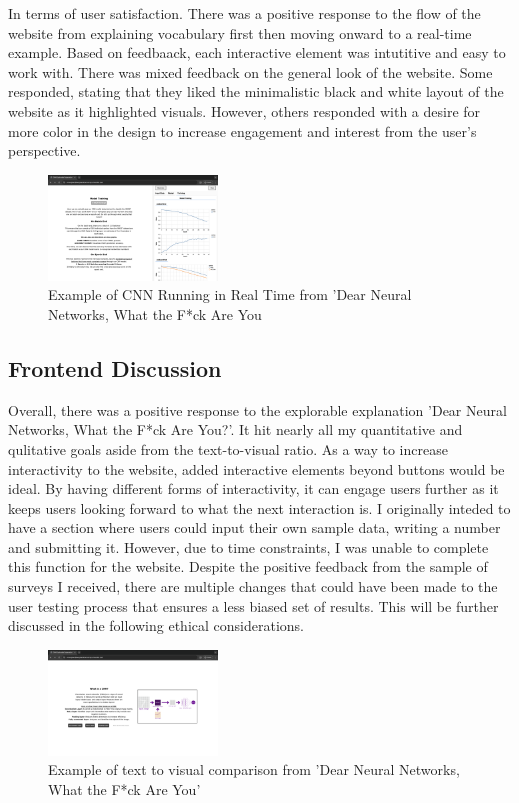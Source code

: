 \documentclass[10pt,twocolumn]{article}
\begin{document}
In terms of user satisfaction. There was a positive response to the flow of the website from explaining vocabulary first then moving onward to a real-time example. Based on feedbaack, each interactive element was intutitive and easy to work with. There was mixed feedback on the general look of the website. Some responded, stating that they liked the minimalistic black and white layout of the website as it highlighted visuals. However, others responded with a  desire for more color in the design to increase engagement and interest from the user's perspective.

\begin{figure}[h]
\caption{Example of CNN Running in Real Time from 'Dear Neural Networks, What the F*ck Are You}
\centering
\includegraphics[width=0.4\textwidth]{./Images/realTimeCNN.png}
\end{figure}

\subsection{Frontend Discussion}
Overall, there was a positive response to the explorable explanation 'Dear Neural Networks, What the F*ck Are You?'. It hit nearly all my quantitative and qulitative goals aside from the text-to-visual ratio. As a way to increase interactivity to the website, added interactive elements beyond buttons would be ideal. By having different forms of interactivity, it can engage users further as it keeps users looking forward to what the next interaction is. I originally inteded to have a section where users could input their own sample data, writing a number and submitting it. However, due to time constraints, I was unable to complete this function for the website. Despite the positive feedback from the sample of surveys I received, there are multiple changes that could have been made to the user testing process that ensures a less biased set of results. This will be further discussed in the following ethical considerations. 
\begin{figure}[h]
\caption{Example of text to visual comparison from 'Dear Neural Networks, What the F*ck Are You'}
\centering
\includegraphics[width=0.4\textwidth]{./Images/textToVisual.png}
\end{figure}
\end{document}
